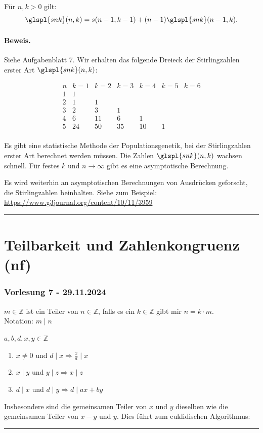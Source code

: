 \documentclass[9pt]{article}
\begin{document}
\begin{satz}
Für $n, k > 0$ gilt:
\[
\glspl{snk}(n, k) = s(n-1, k-1) + (n-1)\glspl{snk}(n-1, k).
\]
\paragraph{Beweis.} Siehe Aufgabenblatt 7.  
Wir erhalten das folgende Dreieck der Stirlingzahlen erster Art $\glspl{snk}(n, k)$:

\[
\begin{array}{c|cccccc}
n & k=1 & k=2 & k=3 & k=4 & k=5 & k=6 \\
\hline
1 & 1 \\
2 & 1 & 1 \\
3 & 2 & 3 & 1 \\
4 & 6 & 11 & 6 & 1 \\
5 & 24 & 50 & 35 & 10 & 1 \\
\end{array}
\] 

Es gibt eine statistische Methode der Populationsgenetik, bei der Stirlingzahlen erster Art berechnet werden müssen. Die Zahlen $\glspl{snk}(n, k)$ wachsen schnell. Für festes $k$ und $n \to \infty$ gibt es eine asymptotische Berechnung.  

Es wird weiterhin an asymptotischen Berechnungen von Ausdrücken geforscht, die Stirlingzahlen beinhalten. Siehe zum Beispiel:  
\url{https://www.g3journal.org/content/10/11/3959}

 \end{satz} \noindent \rule{8cm}{0.4pt}



\section{Teilbarkeit und Zahlenkongruenz (nf)}
\subsubsection*{Vorlesung 7 - 29.11.2024}
$m \in \mathbb{Z}$ ist ein Teiler von $n\in \mathbb{Z}$, falls es ein $k \in \mathbb{Z}$ gibt mir $n = k \cdot m$. \\
Notation: $m \mid n$

\begin{er}
$a,b,d,x,y \in \mathbb{Z}$
\begin{enumerate}
    \item $x \neq 0$ und $d \mid x \Rightarrow \frac{x}{d} \mid x$
    \item $x \mid y$ und $y \mid z \Rightarrow x \mid z$
    \item $d \mid x$ und $d \mid y \Rightarrow d \mid ax + by$ 
\end{enumerate}
Insbesondere sind die gemeinsamen Teiler von $x$ und $y$ dieselben wie die
gemeinsamen Teiler von $x - y$ und $y$. Dies führt zum euklidischen Algorithmus:
\end{er} \noindent \rule{8cm}{0.4pt}
\end{document}
